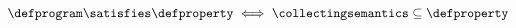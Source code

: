   \begin{align*}
    \defprogram \satisfies \defproperty \iff \collectingsemantics \subseteq \defproperty
  \end{align*}
